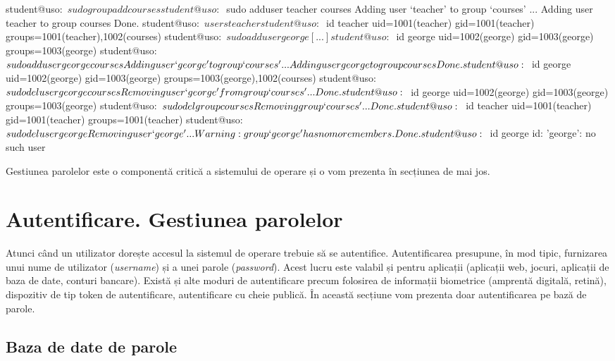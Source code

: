 \begin{screen}[caption={Gestiunea utilizatorilor și grupurilor în Linux},label={lst:user:user-group-linux}]
student@uso:~$ sudo groupadd courses
student@uso:~$ sudo adduser teacher courses
Adding user `teacher' to group `courses' ...
Adding user teacher to group courses
Done.
student@uso:~$ users teacher
student@uso:~$ id teacher
uid=1001(teacher) gid=1001(teacher) groups=1001(teacher),1002(courses)
student@uso:~$ sudo adduser george
[...]
student@uso:~$ id george
uid=1002(george) gid=1003(george) groups=1003(george)
student@uso:~$ sudo adduser george courses
Adding user `george' to group `courses' ...
Adding user george to group courses
Done.
student@uso:~$ id george
uid=1002(george) gid=1003(george) groups=1003(george),1002(courses)
student@uso:~$ sudo deluser george courses
Removing user `george' from group `courses' ...
Done.
student@uso:~$ id george
uid=1002(george) gid=1003(george) groups=1003(george)
student@uso:~$ sudo delgroup courses
Removing group `courses' ...
Done.
student@uso:~$ id teacher
uid=1001(teacher) gid=1001(teacher) groups=1001(teacher)
student@uso:~$ sudo deluser george
Removing user `george' ...
Warning: group `george' has no more members.
Done.
student@uso:~$ id george
id: 'george': no such user
\end{screen}

Gestiunea parolelor este o componentă critică a sistemului de operare și o vom
prezenta în secțiunea de mai jos.

\section{Autentificare. Gestiunea parolelor}
\label{sec:user:auth}

Atunci când un utilizator dorește accesul la sistemul de operare trebuie să se
autentifice. Autentificarea presupune, în mod tipic, furnizarea unui nume de
utilizator (\textit{username}) și a unei parole (\textit{password}). Acest lucru este valabil și
pentru aplicații (aplicații web, jocuri, aplicații de baza de date, conturi
bancare). Există și alte moduri de autentificare precum folosirea de informații
biometrice (amprentă digitală, retină), dispozitiv de tip token de
autentificare, autentificare cu cheie publică. În această secțiune vom prezenta
doar autentificarea pe bază de parole.

\subsection{Baza de date de parole}
\label{sec:user:password-db}

